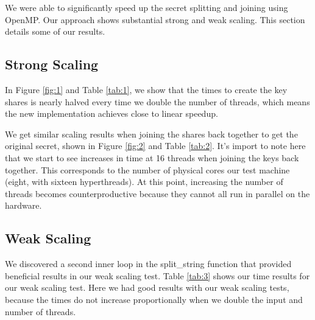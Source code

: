\documentclass[main.tex]{subfiles}
\begin{document}
\indent We were able to significantly speed up the secret splitting and joining using OpenMP. Our approach shows substantial strong and weak scaling. This section details some of our results.

\subsection{Strong Scaling}

\indent In Figure \ref{fig:1} and Table \ref{tab:1}, we show that the times to create the key shares is nearly halved every time we double the number of threads, which means the new implementation achieves close to linear speedup.


\indent We get similar scaling results when joining the shares back together to get the original secret, shown in Figure \ref{fig:2} and Table \ref{tab:2}.  It's import to note here that we start to see increases in time at 16 threads when joining the keys back together.  This corresponds to the number of physical cores our test machine (eight, with sixteen hyperthreads).  At this point, increasing the number of threads becomes counterproductive because they cannot all run in parallel on the hardware.


\subsection{Weak Scaling}

\indent We discovered a second inner loop in the split\_string function that provided beneficial results in our weak scaling test.  Table \ref{tab:3} shows our time results for our weak scaling test.  Here we had good results with our weak scaling tests, because the times do not increase proportionally when we double the input and number of threads.

\end{document}
